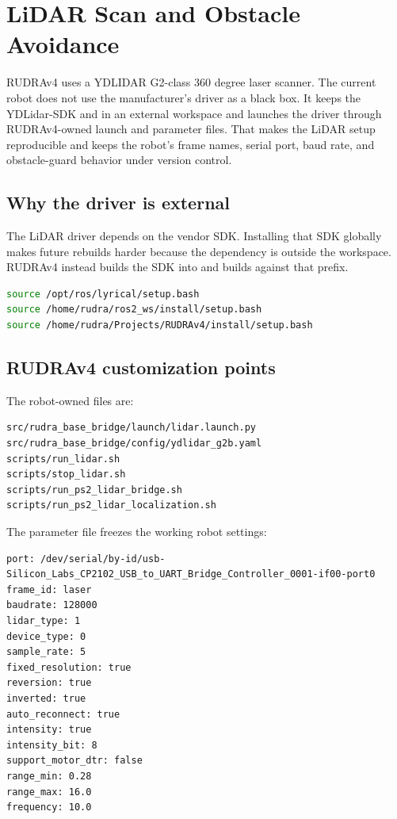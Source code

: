
\chapter{LiDAR Scan and Obstacle Avoidance}
\label{chap:ydlidar-custom}

RUDRAv4 uses a YDLIDAR G2-class 360 degree laser scanner.  The current robot does not use the manufacturer's driver as a black box.  It keeps the YDLidar-SDK and  in an external workspace and launches the driver through RUDRAv4-owned launch and parameter files.  That makes the LiDAR setup reproducible and keeps the robot's frame names, serial port, baud rate, and obstacle-guard behavior under version control.

\section{Why the driver is external}
The LiDAR driver depends on the vendor SDK.  Installing that SDK globally makes future rebuilds harder because the dependency is outside the workspace.  RUDRAv4 instead builds the SDK into  and builds  against that prefix.

\begin{lstlisting}[language=bash,caption={External LiDAR workspace overlay order.}]
source /opt/ros/lyrical/setup.bash
source /home/rudra/ros2_ws/install/setup.bash
source /home/rudra/Projects/RUDRAv4/install/setup.bash
\end{lstlisting}

\section{RUDRAv4 customization points}
The robot-owned files are:

\begin{lstlisting}[caption={LiDAR files owned by RUDRAv4.}]
src/rudra_base_bridge/launch/lidar.launch.py
src/rudra_base_bridge/config/ydlidar_g2b.yaml
scripts/run_lidar.sh
scripts/stop_lidar.sh
scripts/run_ps2_lidar_bridge.sh
scripts/run_ps2_lidar_localization.sh
\end{lstlisting}

The parameter file freezes the working robot settings:

\begin{lstlisting}[caption={Current RUDRAv4 YDLIDAR settings.}]
port: /dev/serial/by-id/usb-Silicon_Labs_CP2102_USB_to_UART_Bridge_Controller_0001-if00-port0
frame_id: laser
baudrate: 128000
lidar_type: 1
device_type: 0
sample_rate: 5
fixed_resolution: true
reversion: true
inverted: true
auto_reconnect: true
intensity: true
intensity_bit: 8
support_motor_dtr: false
range_min: 0.28
range_max: 16.0
frequency: 10.0
\end{lstlisting}

